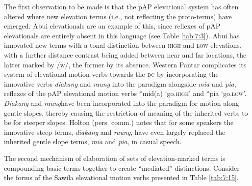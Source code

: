 The first observation to be made is that the pAP elevational system has often altered where new elevation terms (i.e., not reflecting the proto-terms) have emerged. Abui elevationals are an example of this, since reflexes of pAP elevationals are entirely absent in this language (see Table \ref{tab:7:3}). Abui has innovated new terms with a tonal distinction between \textsc{high} and \textsc{low} elevations, with a further distance contrast being added between near and far locations, the latter marked by /w/, the former by its absence. Western Pantar complicates its system of elevational motion verbs towards the \textsc{dc} by incorporating the innovative verbs \textit{diakang} and \textit{raung} into the paradigm alongside \textit{mia} and \textit{pia}, reflexes of the pAP elevational motion verbs *mid(a) `go.\textsc{high'} and *pia `go.\textsc{low'.} \textit{Diakang} and \textit{raung}have been incorporated into the paradigm for motion along gentle slopes, thereby causing the restriction of meaning of the inherited verbs to be for steeper slopes. Holton (pers. comm.) notes that for some speakers the innovative steep terms, \textit{diakang} and \textit{raung}, have even largely replaced the inherited gentle slope terms, \textit{mia} and \textit{pia}, in casual speech. 

The second mechanism of elaboration of sets of elevation-marked terms is compounding basic terms together to create ``mediated'' distinctions. Consider the forms of the Sawila elevational motion verbs presented in Table \ref{tab:7:15}. 

 



